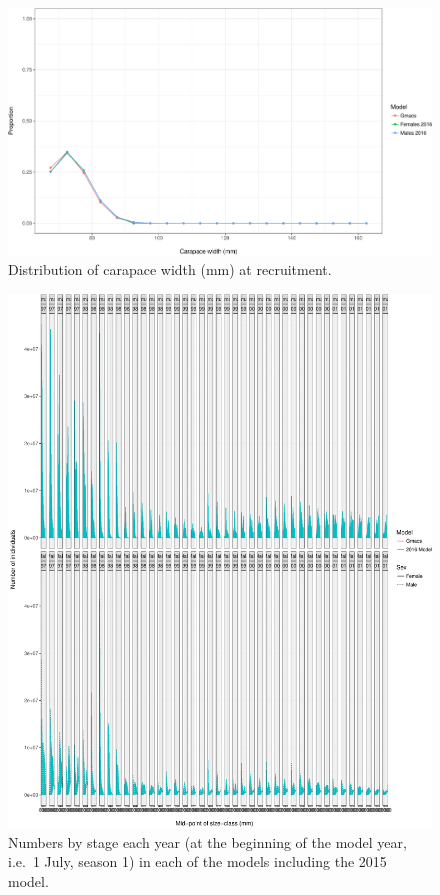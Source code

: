 \documentclass[]{article}
\begin{document}
\begin{figure}[htbp]
\centering
\includegraphics{bbrkc_files/figure-latex/init_rec-1.pdf}
\caption{Distribution of carapace width (mm) at
recruitment.\label{fig:init_rec}}
\end{figure}

\begin{figure}[htbp]
\centering
\includegraphics{bbrkc_files/figure-latex/init_N-1.pdf}
\caption{Numbers by stage each year (at the beginning of the model year,
i.e.~1 July, season 1) in each of the models including the 2015
model.\label{fig:init_N}}
\end{figure}
\end{document}

